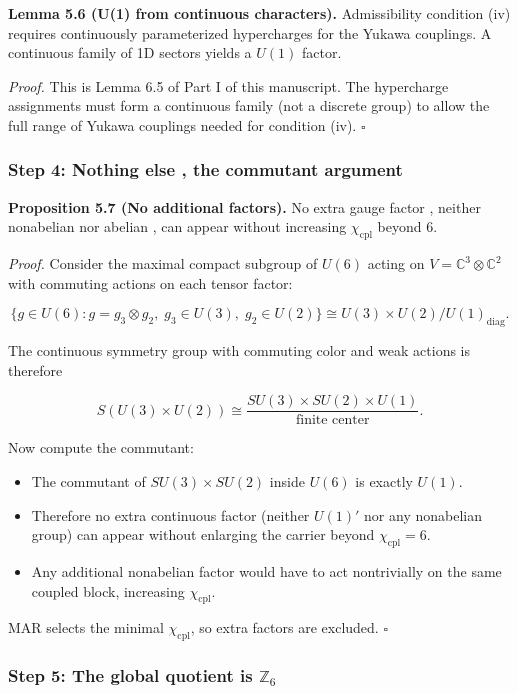\textbf{Lemma 5.6 (U(1) from continuous characters).} Admissibility condition (iv) requires continuously parameterized hypercharges for the Yukawa couplings. A continuous family of 1D sectors yields a \(U(1)\) factor.

\emph{Proof.} This is Lemma 6.5 of Part I of this manuscript. The hypercharge assignments must form a continuous family (not a discrete group) to allow the full range of Yukawa couplings needed for condition (iv). \(\square\)

\subsubsection{Step 4: Nothing else , the commutant argument}\label{step-4-nothing-else--the-commutant-argument}

\textbf{Proposition 5.7 (No additional factors).} No extra gauge factor , neither nonabelian nor abelian , can appear without increasing \(\chi_{\mathrm{cpl}}\) beyond 6.

\emph{Proof.} Consider the maximal compact subgroup of \(U(6)\) acting on \(V = \mathbb{C}^3 \otimes \mathbb{C}^2\) with commuting actions on each tensor factor:

\[\{g \in U(6) : g = g_3 \otimes g_2,\; g_3 \in U(3),\; g_2 \in U(2)\} \cong U(3) \times U(2) / U(1)_{\mathrm{diag}}.\]

The continuous symmetry group with commuting color and weak actions is therefore

\[S(U(3) \times U(2)) \cong \frac{SU(3) \times SU(2) \times U(1)}{\text{finite center}}.\]

Now compute the commutant:

\begin{itemize}
\tightlist
\item
  The commutant of \(SU(3) \times SU(2)\) inside \(U(6)\) is exactly \(U(1)\).
\item
  Therefore no extra continuous factor (neither \(U(1)'\) nor any nonabelian group) can appear without enlarging the carrier beyond \(\chi_{\mathrm{cpl}} = 6\).
\item
  Any additional nonabelian factor would have to act nontrivially on the same coupled block, increasing \(\chi_{\mathrm{cpl}}\).
\end{itemize}

MAR selects the minimal \(\chi_{\mathrm{cpl}}\), so extra factors are excluded. \(\square\)

\subsubsection{\texorpdfstring{Step 5: The global quotient is \(\mathbb{Z}_6\)}{Step 5: The global quotient is \textbackslash mathbb\{Z\}\_6}}\label{step-5-the-global-quotient-is-mathbbz_6}

